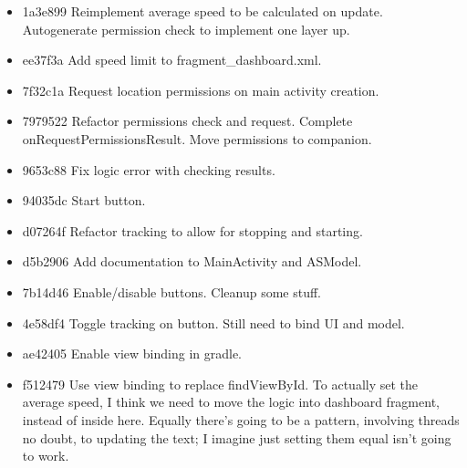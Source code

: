 \documentclass[11pt, a4paper, notitlepage]{report}
\begin{document}
\begin{itemize}
	\item 1a3e899 Reimplement average speed to be calculated on update. Autogenerate permission check to implement one layer up. 
	\item ee37f3a Add speed limit to fragment\_dashboard.xml. 
	\item 7f32c1a Request location permissions on main activity creation. 
	\item 7979522 Refactor permissions check and request. Complete onRequestPermissionsResult. Move permissions to companion. 
	\item 9653c88 Fix logic error with checking results. 
	\item 94035dc Start button. 
	\item d07264f Refactor tracking to allow for stopping and starting. 
	\item d5b2906 Add documentation to MainActivity and ASModel. 
	\item 7b14d46 Enable/disable buttons. Cleanup some stuff. 
	\item 4e58df4 Toggle tracking on button. Still need to bind UI and model. 
	\item ae42405 Enable view binding in gradle. 
	\item f512479 Use view binding to replace findViewById. To actually set the average speed, I think we need to move the logic into dashboard fragment, instead of inside here.
	Equally there's going to be a pattern, involving threads no doubt, to updating the text; I imagine just setting them equal isn't going to work.
	

\end{itemize}
\end{document}
